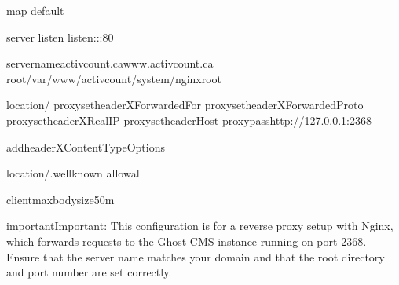 \documentclass[letterpaper,10pt,english]{sphinxmanual}
\begin{document}
\begin{sphinxVerbatim}[commandchars=\\\{\}]
map
default

server
listen
listen\PYG{o}{[}::\PYG{o}{]}:80

server\PYGZus{}nameactivcount.cawww.activcount.ca
root/var/www/activcount/system/nginx\PYGZhy{}root

location/
proxy\PYGZus{}set\PYGZus{}headerX\PYGZhy{}Forwarded\PYGZhy{}For
proxy\PYGZus{}set\PYGZus{}headerX\PYGZhy{}Forwarded\PYGZhy{}Proto
proxy\PYGZus{}set\PYGZus{}headerX\PYGZhy{}Real\PYGZhy{}IP
proxy\PYGZus{}set\PYGZus{}headerHost
proxy\PYGZus{}passhttp://127.0.0.1:2368

add\PYGZus{}headerX\PYGZhy{}Content\PYGZhy{}Type\PYGZhy{}Options

location\PYGZti{}/.well\PYGZhy{}known
allowall

client\PYGZus{}max\PYGZus{}body\PYGZus{}size50m
\end{sphinxVerbatim}

\begin{sphinxadmonition}{important}{Important:}
\sphinxAtStartPar
This configuration is for a reverse proxy setup with Nginx, which forwards requests to the Ghost CMS instance running on port 2368. Ensure that the server name matches your domain and that the root directory and port number are set correctly.
\end{sphinxadmonition}
\end{document}
